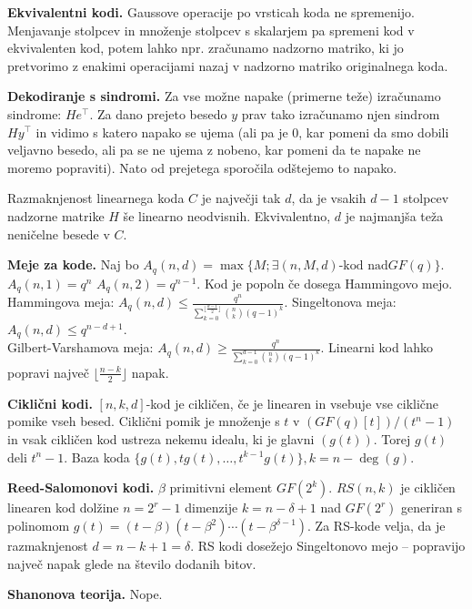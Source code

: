 \documentclass[a4paper, oneside, 10pt]{article}
\theoremstyle{definition}
\begin{document}
\textbf{Ekvivalentni kodi.}
Gaussove operacije po vrsticah koda ne spremenijo. Menjavanje stolpcev in množenje
stolpcev s skalarjem pa spremeni kod v ekvivalenten kod, potem lahko npr. zračunamo
nadzorno matriko, ki jo pretvorimo z enakimi operacijami nazaj v nadzorno matriko
originalnega koda.

\textbf{Dekodiranje s sindromi.} Za vse možne napake (primerne teže) izračunamo sindrome:
$He^\top$. Za dano prejeto besedo $y$ prav tako izračunamo njen sindrom $Hy^\top$ in vidimo s
katero napako se ujema (ali pa je 0, kar pomeni da smo dobili veljavno besedo, ali pa se
ne ujema z nobeno, kar pomeni da te napake ne moremo popraviti). Nato od prejetega sporočila odštejemo to napako.

Razmaknjenost linearnega koda $C$ je največji tak $d$, da je vsakih $d-1$  stolpcev
nadzorne matrike $H$ še linearno
neodvisnih. Ekvivalentno, $d$ je najmanjša teža neničelne besede v $C$.

\textbf{Meje za kode.} Naj bo $A_q(n,d) = \max\{M; \exists (n,M,d)\text{-kod nad
}GF(q)\}$. $A_q(n,1) = q^n$ $A_q(n,2) = q^{n-1}$. Kod je popoln če dosega Hammingovo mejo.\\
Hammingova meja: $A_q(n,d) \le \frac{q^n}{\sum_{k=0}^{\lfloor\frac{d-1}{2}\rfloor}\binom{n}{k}(q-1)^k}$.
Singeltonova meja: $A_q(n,d) \leq q^{n-d+1}$. \\ 
Gilbert-Varshamova meja: $A_q(n,d) \geq \frac{q^n}{\sum_{k=0}^{d-1}\binom{n}{k}(q-1)^k}$.
Linearni kod lahko popravi največ $\lfloor\frac{n-k}{2}\rfloor$ napak.

\textbf{Ciklični kodi.} $[n,k,d]$-kod je cikličen, če je linearen in vsebuje vse ciklične pomike vseh
besed. Ciklični pomik je množenje s $t$ v $(GF(q)[t])/(t^n-1)$ in vsak cikličen kod
ustreza nekemu idealu, ki je glavni $(g(t))$. Torej $g(t)$ deli $t^n-1$. Baza koda $\{g(t), tg(t), \dots,
t^{k-1}g(t)\}, k = n-\deg(g)$.

\textbf{Reed-Salomonovi kodi.} $\beta$ primitivni element $GF(2^k)$. $RS(n,k)$ je cikličen
linearen kod dolžine $n=2^r-1$ dimenzije $k = n-\delta+1$ nad $GF(2^r)$ generiran s polinomom
$g(t) = (t-\beta)(t-\beta^2)\cdots(t-\beta^{\delta-1})$. Za RS-kode velja, da je
razmaknjenost $d = n-k+1 = \delta$. RS kodi dosežejo Singeltonovo
mejo -- popravijo največ napak glede na število dodanih bitov.

\textbf{Shanonova teorija.} Nope.
\end{document}
